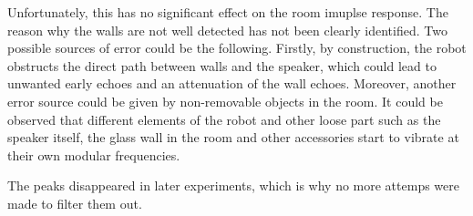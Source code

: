 Unfortunately, this has no significant effect on the room imuplse response. The reason why the walls are not well detected has not been clearly identified. 
Two possible sources of error could be the following.
Firstly, by construction, the robot obstructs the direct path between walls and the speaker, which could lead to unwanted early echoes and an attenuation of the wall echoes.
Moreover, another error source could be given by non-removable objects in the room. 
It could be observed that different elements of the robot and other loose part such as the speaker itself, the glass wall in the room and other accessories start to vibrate at their own modular frequencies.

The peaks disappeared in later experiments, which is why no more attemps were made to filter them out. 

